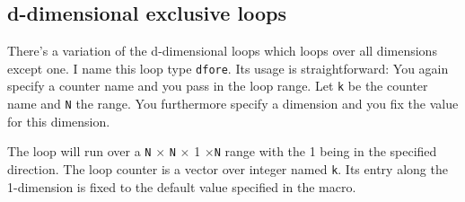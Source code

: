 \subsection{d-dimensional exclusive loops}

There's a variation of the d-dimensional loops which loops over all dimensions
except one.
I name this loop type \texttt{dfore}.
Its usage is straightforward: 
You again specify a counter name and you pass in the loop range. 
Let \texttt{k} be the counter name and \texttt{N} the range.
You furthermore specify a dimension and you fix the value for this dimension.

The loop will run over a \texttt{N} $\times $ \texttt{N} $\times $ 1 $\times
$\texttt{N} range with the 1 being in the specified direction.
The loop counter is a vector over integer named \texttt{k}.
Its entry along the 1-dimension is fixed to the default value specified in the
macro.


